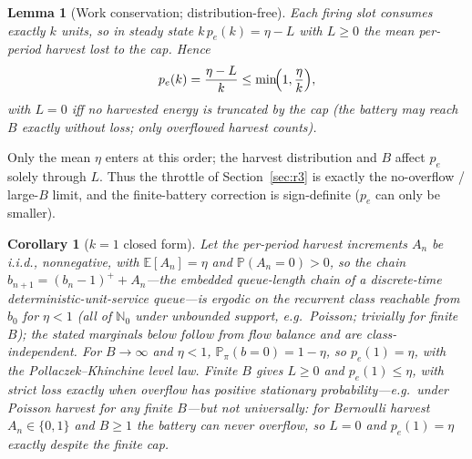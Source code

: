 \documentclass[twocolumn,3p,times,procedia]{elsarticle}
\newtheorem{lemma}{Lemma}
\newtheorem{corollary}{Corollary}
\newcommand{\E}{\mathbb{E}}
\newcommand{\Prob}{\mathbb{P}}
\newcommand{\peff}{p_e}
\begin{document}
\begin{lemma}[Work conservation; distribution-free]\label{lem:work}
Each firing slot consumes exactly $k$ units, so in steady state
$k\,\peff(k)=\eta-L$ with $L\ge0$ the mean per-period harvest lost to the
cap. Hence
\begin{equation}
\peff(k)=\frac{\eta-L}{k}\le\min\!\Bigl(1,\frac{\eta}{k}\Bigr),
\end{equation}
with $L=0$ iff no harvested energy is truncated by the cap (the battery
may reach $B$ exactly without loss; only overflowed harvest counts).
\end{lemma}

Only the mean $\eta$ enters at this order; the harvest distribution and
$B$ affect $\peff$ solely through $L$. Thus the throttle of
Section~\ref{sec:r3} is exactly the no-overflow / large-$B$ limit, and
the finite-battery correction is sign-definite ($\peff$ can only be
smaller).

\begin{corollary}[$k=1$ closed form]
Let the per-period harvest increments $A_n$ be i.i.d., nonnegative,
with $\E[A_n]=\eta$ and $\Prob(A_n{=}0)>0$, so the chain
$b_{n+1}=(b_n-1)^+ + A_n$---the
embedded queue-length chain of a discrete-time deterministic-unit-service
queue---is ergodic on the recurrent class reachable from $b_0$ for
$\eta<1$ (all of $\mathbb{N}_0$ under unbounded support, e.g.\
Poisson; trivially for finite $B$); the stated marginals below follow
from flow balance and are class-independent. For $B\to\infty$ and
$\eta<1$, $\Prob_\pi(b=0)=1-\eta$, so $\peff(1)=\eta$, with the
Pollaczek--Khinchine level law. Finite $B$ gives $L\ge0$ and
$\peff(1)\le\eta$, with \emph{strict} loss exactly when overflow has
positive stationary probability---e.g.\ under Poisson harvest for any
finite $B$---but not universally: for Bernoulli harvest
$A_n\in\{0,1\}$ and $B\ge1$ the battery can never overflow, so $L=0$
and $\peff(1)=\eta$ exactly despite the finite cap.
\end{corollary}
\end{document}
